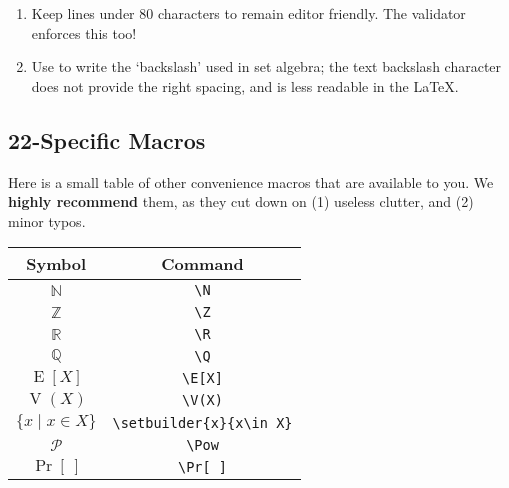 {\begin{enumerate}
      \textbf{Example}: \texttt{3 4 5} compiles to 
        $3\equiv 4\pmod 5$.
      
      \textbf{Wrong}: \texttt{3 4 5} compiles to 
        $3\equiv 4\mod 5$, has weird spacing and we wish to maintain 
        consistency.
      
      \textbf{Very Wrong}: \texttt{3=4 mod 5} compiles to $3=4 mod 5$ and 
        will lead to spontaneous crying among the staff.   
    \item Keep lines under 80 characters to remain editor friendly.
      The validator enforces this too!
    \item Use  to write the `backslash' used in set algebra;
      the text backslash character does not provide the right spacing, and is 
      less readable in the \LaTeX.
  \end{enumerate}
  
  \subsection{22-Specific Macros}
    Here is a small table of other convenience macros that are available to you.
    We \textbf{highly recommend} them, as they cut down on (1) useless 
    clutter, and (2) minor typos.
    
    \begin{center}
      \begin{tabular}{|c|c|}
        \hline
        \textbf{Symbol} & \textbf{Command} \\\hline
        $\mathbb{N}$ & \texttt{\textbackslash N} \\\hline
        $\mathbb{Z}$ & \texttt{\textbackslash Z} \\\hline
        $\mathbb{R}$ & \texttt{\textbackslash R} \\\hline
        $\mathbb{Q}$ & \texttt{\textbackslash Q} \\\hline
        $\operatorname{E}[X]$ & \texttt{\textbackslash E[X]} \\\hline
        $\operatorname{V}(X)$ & \texttt{\textbackslash V(X)} \\\hline
        $\{x\;|\;x\in X\}$ & \texttt{\textbackslash setbuilder\{x\}\{x\textbackslash in\ X\}} \\\hline
        $\mathcal{P}$ & \texttt{\textbackslash Pow} \\\hline
        $\Pr[\ ]$ & \texttt{\textbackslash Pr[\ ]} \\\hline
      \end{tabular}
    \end{center}
    
}
